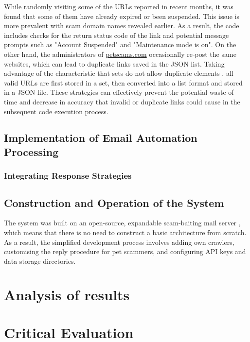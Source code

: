 \documentclass[ oneside,%
                    author={Cassie Qing Tang},
                    degree={BSc},
                     title={An Automated Response System for Disrupting Online Pet Scamming \\ },
                    subtitle={ }]{dissertation}
\begin{document}
While randomly visiting some of the URLs reported in recent months, it was found that some of them have already expired or been suspended. This issue is more prevalent with scam domain names revealed earlier. As a result, the code includes checks for the return status code of the link and potential message prompts such as "Account Suspended" and "Maintenance mode is on". On the other hand, the administrators of \url{petscams.com} occasionally re-post the same websites, which can lead to duplicate links saved in the JSON list. Taking advantage of the characteristic that sets do not allow duplicate elements \cite{sturtz_sets_nodate}, all valid URLs are first stored in a set, then converted into a list format and stored in a JSON file. These strategies can effectively prevent the potential waste of time and decrease in accuracy that invalid or duplicate links could cause in the subsequent code execution process.




\section{Implementation of Email Automation Processing}

\subsection{Integrating Response Strategies}





\section{Construction and Operation of the System}
The system was built on an open-source, expandable scam-baiting mail server \cite{an19352_an19352scambaiter_back_2023}, which means that there is no need to construct a basic architecture from scratch. As a result, the simplified development process involves adding own crawlers, customising the reply procedure for pet scammers, and configuring API keys and data storage directories.




\chapter{Analysis of results}



\chapter{Critical Evaluation}
\end{document}
